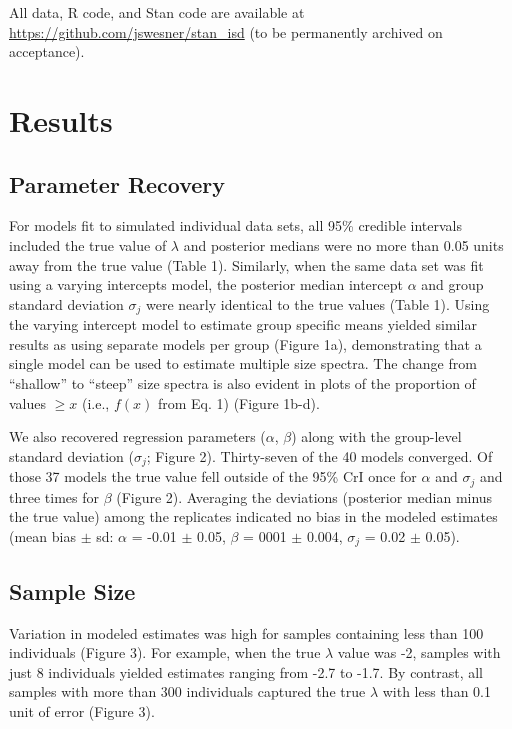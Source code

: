 \documentclass[
  12pt,
]{article}
\begin{document}
All data, R code, and Stan code are available at
\url{https://github.com/jswesner/stan_isd} (to be permanently archived
on acceptance).

\hypertarget{results}{%
\section{Results}\label{results}}

\hypertarget{parameter-recovery}{%
\subsection{Parameter Recovery}\label{parameter-recovery}}

For models fit to simulated individual data sets, all 95\% credible
intervals included the true value of \(\lambda\) and posterior medians
were no more than 0.05 units away from the true value (Table 1).
Similarly, when the same data set was fit using a varying intercepts
model, the posterior median intercept \(\alpha\) and group standard
deviation \(\sigma_{j}\) were nearly identical to the true values (Table
1). Using the varying intercept model to estimate group specific means
yielded similar results as using separate models per group (Figure 1a),
demonstrating that a single model can be used to estimate multiple size
spectra. The change from ``shallow'' to ``steep'' size spectra is also
evident in plots of the proportion of values \(\ge x\) (i.e., \(f(x)\)
from Eq. 1) (Figure 1b-d).

We also recovered regression parameters (\(\alpha\), \(\beta\)) along
with the group-level standard deviation (\(\sigma_{j}\); Figure 2).
Thirty-seven of the 40 models converged. Of those 37 models the true
value fell outside of the 95\% CrI once for \(\alpha\) and
\(\sigma_{j}\) and three times for \(\beta\) (Figure 2). Averaging the
deviations (posterior median minus the true value) among the replicates
indicated no bias in the modeled estimates (mean bias \(\pm\) sd:
\(\alpha\) = -0.01 \(\pm\) 0.05, \(\beta\) = 0001 \(\pm\) 0.004,
\(\sigma_{j}\) = 0.02 \(\pm\) 0.05).

\hypertarget{sample-size-1}{%
\subsection{Sample Size}\label{sample-size-1}}

Variation in modeled estimates was high for samples containing less than
100 individuals (Figure 3). For example, when the true \(\lambda\) value
was -2, samples with just 8 individuals yielded estimates ranging from
-2.7 to -1.7. By contrast, all samples with more than 300 individuals
captured the true \(\lambda\) with less than 0.1 unit of error (Figure
3).
\end{document}
